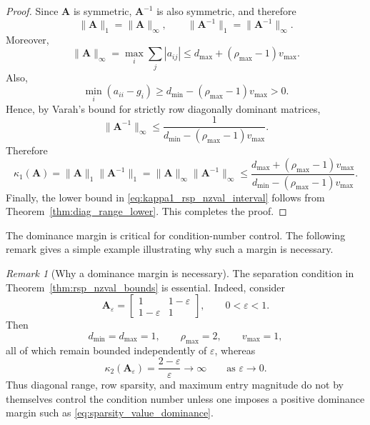 \documentclass[11pt,a4paper]{article}
\theoremstyle{plain}
\theoremstyle{definition}
\theoremstyle{remark}
\newtheorem{remark}{Remark}
\begin{document}
\begin{proof}
Since $\mathbf{A}$ is symmetric, $\mathbf{A}^{-1}$ is also symmetric, and therefore
\begin{equation*}
\|\mathbf{A}\|_1=\|\mathbf{A}\|_\infty,
\qquad
\|\mathbf{A}^{-1}\|_1=\|\mathbf{A}^{-1}\|_\infty.
\end{equation*}
Moreover,
\begin{equation*}
\|\mathbf{A}\|_\infty
=
\max_i\sum_j |a_{ij}|
\le
d_{\max}+(\rho_{\max}-1)v_{\max}.
\end{equation*}
Also,
\begin{equation*}
\min_i(a_{ii}-g_i)\ge d_{\min}-(\rho_{\max}-1)v_{\max}>0.
\end{equation*}
Hence, by Varah's bound for strictly row diagonally dominant matrices,
\begin{equation*}
\|\mathbf{A}^{-1}\|_\infty
\le
\frac{1}{d_{\min}-(\rho_{\max}-1)v_{\max}}.
\end{equation*}
Therefore
\begin{equation*}
\kappa_1(\mathbf{A})
=
\|\mathbf{A}\|_1\|\mathbf{A}^{-1}\|_1
=
\|\mathbf{A}\|_\infty\|\mathbf{A}^{-1}\|_\infty
\le
\frac{d_{\max}+(\rho_{\max}-1)v_{\max}}
{d_{\min}-(\rho_{\max}-1)v_{\max}}.
\end{equation*}
Finally, the lower bound in \eqref{eq:kappa1_rsp_nzval_interval} follows from Theorem~\ref{thm:diag_range_lower}. This completes the proof.
\end{proof}



The dominance margin is critical for condition-number control. The following remark gives a simple example illustrating why such a margin is necessary.
\begin{remark}[Why a dominance margin is necessary]
\label{rem:need_margin}
The separation condition in Theorem~\ref{thm:rsp_nzval_bounds} is essential. Indeed, consider
\begin{equation*}
\mathbf{A}_\varepsilon
=
\begin{bmatrix}
1 & 1-\varepsilon\\
1-\varepsilon & 1
\end{bmatrix},
\qquad 0<\varepsilon<1.
\end{equation*}
Then
\begin{equation*}
d_{\min}=d_{\max}=1,\qquad
\rho_{\max}=2,\qquad
v_{\max}=1,
\end{equation*}
all of which remain bounded independently of $\varepsilon$, whereas
\begin{equation*}
\kappa_2(\mathbf{A}_\varepsilon)=\frac{2-\varepsilon}{\varepsilon}\to\infty
\qquad\text{as }\varepsilon\rightarrow 0.
\end{equation*}
Thus diagonal range, row sparsity, and maximum entry magnitude do not by themselves control the condition number unless one imposes a positive dominance margin such as \eqref{eq:sparsity_value_dominance}.
\end{remark}
\end{document}
